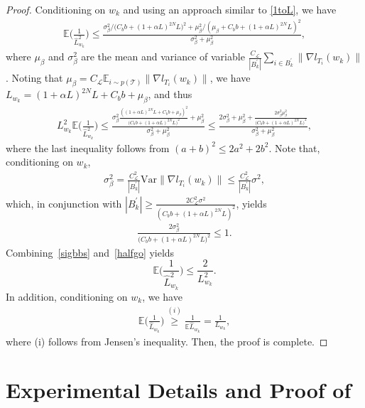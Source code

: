 \documentclass{osudissert96}
\begin{document}
\begin{proof}
	Conditioning on $w_k$ and using an approach similar to \cref{1toL}, we have 	
	\begin{align}
	\mathbb{E} \Big( \frac{1}{\hat L^2_{w_k}}  \Big) \leq \frac{\sigma_\beta^2 / \big(  C_b b + (1+\alpha L)^{2N} L  \big)^2 + \mu^2_\beta / (\mu_\beta + C_b b + (1+\alpha L)^{2N} L)^2}{\sigma_\beta^2 + \mu_\beta^2},
	\end{align}
	where $\mu_\beta$ and $\sigma^2_\beta$ are the  mean and variance of variable $\frac{C_\mathcal{L}}{|B_k^\prime|}\sum_{i \in B_k^\prime}\|\nabla l_{T_i}(w_k)\|$. Noting that $\mu_\beta = C_\mathcal{L} \mathbb{E}_{i\sim p(\mathcal{T})}\|\nabla l_{T_i}(w_k)\|$, we have $L_{w_k} = (1+\alpha L)^{2N}L + C_b b +  \mu_\beta$, and thus 
	\begin{align}\label{halfgo}
	L^2_{w_k}\mathbb{E} \Big( \frac{1}{\hat L^2_{w_k}}  \Big) \leq \frac{\sigma_\beta^2\frac{((1+\alpha L)^{2N}L + C_b b +  \mu_\beta)^2}{ \big(  C_b b + (1+\alpha L)^{2N} L  \big)^2 }+ \mu^2_\beta }{\sigma_\beta^2 + \mu_\beta^2} \leq \frac{2\sigma_\beta^2+\mu_\beta^2 + \frac{2\sigma_\beta^2\mu_\beta^2}{ \big(  C_b b + (1+\alpha L)^{2N} L  \big)^2}}{\sigma_\beta^2 + \mu_\beta^2},
	\end{align}
	where the last inequality follows from $(a+b)^2\leq 2a^2+2b^2$.
	Note that, conditioning on $w_k$, 
	\begin{align*}
	\sigma_\beta^2 = \frac{C^2_\mathcal{L} }{|B_k^\prime|}    \text{Var} \|\nabla l_{T_i}(w_k)\| \leq  \frac{C^2_\mathcal{L} }{|B_k^\prime|}   \sigma^2,
	\end{align*}
	which, in conjunction with $|B_k^\prime| \geq \frac{2C^2_\mathcal{L}\sigma^2}{( C_b b + (1+\alpha L)^{2N} L)^2}$, yields
	\begin{align}\label{sigbbs}
	\frac{2\sigma_\beta^2}{ \big(  C_b b + (1+\alpha L)^{2N} L  \big)^2} \leq 1.
	\end{align}
	Combining~\cref{sigbbs} and~\cref{halfgo} yields $$\mathbb{E} \Big( \frac{1}{\hat L^2_{w_k}}  \Big) \leq \frac{2}{L^2_{w_k}}. $$ 
	In addition, conditioning on $w_k$, we have
	\begin{align}
	\mathbb{E} \Big( \frac{1}{\hat L_{w_k}}  \Big)  \overset{(i)}\geq\frac{1}{	\mathbb{E}  \hat L_{w_k}}  = \frac{1}{L_{w_k}},
	\end{align}
	where (i) follows from  Jensen's inequality. Then, the proof is complete. 
\end{proof}

\chapter{Experimental Details and Proof of }\label{appendix:anil}
\end{document}
